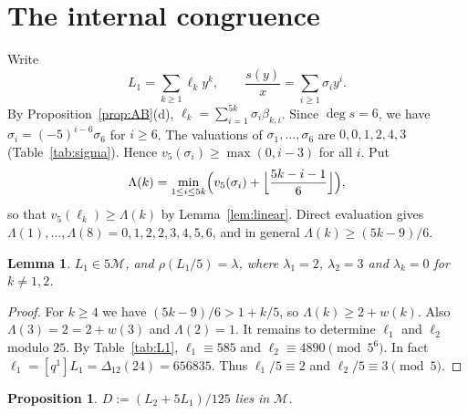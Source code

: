 \documentclass[11pt]{article}
\newtheorem{lemma}[theorem]{Lemma}
\newtheorem{proposition}[theorem]{Proposition}
\theoremstyle{definition}
\theoremstyle{remark}
\numberwithin{equation}{section}
\newcommand{\Mod}{\mathscr{M}}
\begin{document}
\section{The internal congruence}\label{sec:internal}

Write
\[
L_1=\sum_{k\ge1}\ell_ky^k,\qquad\frac{s(y)}{x}=\sum_{i\ge1}\sigma_iy^i.
\]
By Proposition~\ref{prop:AB}(d), $\ell_k=\sum_{i=1}^{5k}\sigma_i\beta_{k,i}$. Since $\deg s=6$, we have $\sigma_i=(-5)^{i-6}\sigma_6$ for $i\ge6$. The valuations of $\sigma_1,\dots,\sigma_6$ are $0,0,1,2,4,3$ (Table~\ref{tab:sigma}). Hence $v_5(\sigma_i)\ge\max(0,i-3)$ for all $i$. Put
\[
\Lambda(k)=\min_{1\le i\le5k}\Bigl(v_5(\sigma_i)+\Bigl\lfloor\frac{5k-i-1}6\Bigr\rfloor\Bigr),
\]
so that $v_5(\ell_k)\ge\Lambda(k)$ by Lemma~\ref{lem:linear}. Direct evaluation gives $\Lambda(1),\dots,\Lambda(8)=0,1,2,2,3,4,5,6$, and in general $\Lambda(k)\ge(5k-9)/6$.

\begin{lemma}\label{lem:L1}
$L_1\in5\Mod$, and $\rho(L_1/5)=\lambda$, where $\lambda_1=2$, $\lambda_2=3$ and $\lambda_k=0$ for $k\ne1,2$.
\end{lemma}

\begin{proof}
For $k\ge4$ we have $(5k-9)/6>1+k/5$, so $\Lambda(k)\ge2+w(k)$. Also $\Lambda(3)=2=2+w(3)$ and $\Lambda(2)=1$. It remains to determine $\ell_1$ and $\ell_2$ modulo $25$. By Table~\ref{tab:L1}, $\ell_1\equiv585$ and $\ell_2\equiv4890\pmod{5^6}$. In fact $\ell_1=[q^1]L_1=\Delta_{12}(24)=656835$. Thus $\ell_1/5\equiv2$ and $\ell_2/5\equiv3\pmod5$.
\end{proof}

\begin{proposition}\label{prop:D}
$D:=(L_2+5L_1)/125$ lies in $\Mod$.
\end{proposition}
\end{document}
